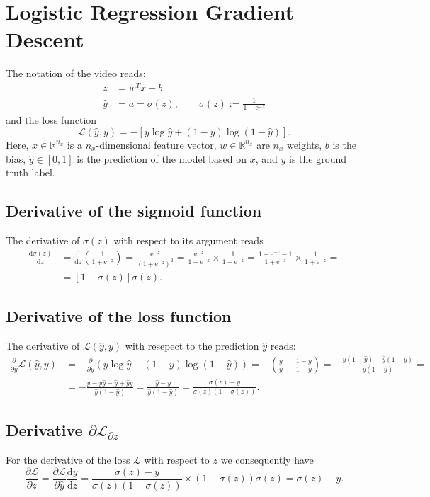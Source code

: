 \documentclass[a4paper,11pt]{article}
\newcommand{\of}[1]{\left( {#1} \right)}
\newcommand{\ofs}[1]{\left[ {#1} \right]}
\newcommand{\fracd}[2]{\frac{\dd{}{#1}}{\dd{}{#2}}}
\newcommand{\fracp}[2]{\frac{\partial{}{#1}}{\partial{}{#2}}}
\newcommand{\dd}{\text{d}}
\newcommand{\ee}{\text{e}}
\begin{document}
\section*{Logistic Regression Gradient Descent}
The notation of the video reads:
\[
\begin{split}
z & = w^T x + b,\\
\hat y &= a = \sigma\of{z}, \qquad \sigma\of{z} := \frac{1}{1 + \ee^{-z}}
\end{split}
\]
and the loss function
\[
\mathcal{L}\of{\hat{y}, y} = - \ofs{y \log\hat{y} + \of{1 - y} \log \of {1 - \hat{y}}}.
\]
Here, $x \in \mathbb{R}^{n_x}$ is a $n_x$-dimensional feature vector,
$w \in \mathbb{R}^{n_x}$ are $n_x$ weights, $b$ is the bias, $\hat{y}
\in [0, 1]$ is the prediction of the model based on $x$, and $y$ is
the ground truth label.

\subsection*{Derivative of the sigmoid function}
The derivative of $\sigma\of{z}$ with respect to its argument reads
\[
\begin{split}
\fracd{\sigma\of{z}}{z} &= \fracd{}{z}\of{\frac{1}{1 + \ee^{-z}}}
                        = \frac{\ee^{-z}}{\of{1 + \ee^{-z}}^2}
                        = \frac{\ee^{-z}}{1 + \ee^{-z}} \times \frac{1}{1 + \ee^{-z}}
                        = \frac{1 + \ee^{-z} - 1}{1 + \ee^{-z}} \times \frac{1}{1 + \ee^{-z}} =\\
                        &= \ofs{1 - \sigma\of{z}} \sigma\of{z}.
\end{split}
\]

\subsection*{Derivative of the loss function}
The derivative of $\mathcal{L}\of{\hat{y}, y}$ with resepect to the prediction $\hat{y}$ reads:
\[
\begin{split}
\fracp{}{\hat{y}} \mathcal{L}\of{\hat{y}, y} &=
- \fracp{}{\hat{y}} \of{y \log\hat{y} + \of{1 - y} \log\of{1 - \hat{y}}} =
- \of{\frac{y}{\hat{y}} - \frac{1 - y}{1 - \hat{y}}} =
- \frac{y\of{1-\hat{y}} - \hat{y}\of{1-y}}{\hat{y}\of{1 - \hat{y}}} = \\
&=
- \frac{y - y\hat{y} - \hat{y} + \hat{y}y}{\hat{y}\of{1 - \hat{y}}} =
  \frac{\hat{y} - y}{\hat{y}\of{1 - \hat{y}}} =
  \frac{\sigma\of{z} - y}{\sigma\of{z}\of{1 - \sigma\of{z}}}.
\end{split}
\]

\subsection*{Derivative $\partial\mathcal{L}_{\partial z}$}
For the derivative of the loss $\mathcal{L}$ with respect to $z$ we
consequently have
\[
\fracp{\mathcal{L}}{z} =
\fracp{\mathcal{L}}{\hat{y}} \fracd{\hat{y}}{z} =
\frac{\sigma\of{z} - y}{\sigma\of{z}\of{1 - \sigma\of{z}}} \times \of{1 - \sigma\of{z}}\sigma\of{z} = 
\sigma\of{z} - y.
\]
\end{document}
